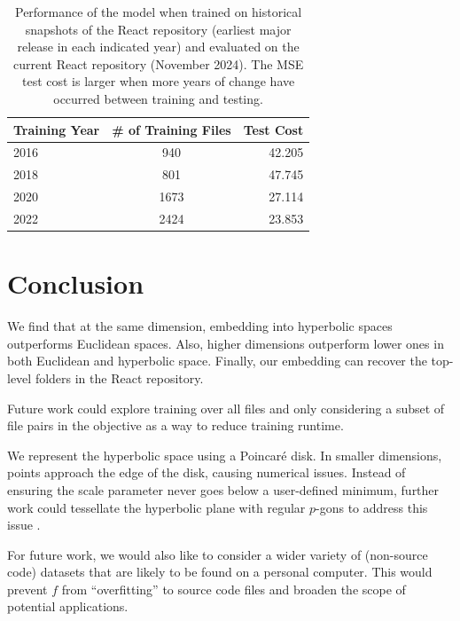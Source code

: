 \documentclass{article}
\begin{document}
\begin{table}[H]
  \centering
  \begin{tabular}{lcr}
    \toprule
    \textbf{Training Year} & \textbf{\# of Training Files} & \textbf{Test Cost} \\
    \midrule
    2016                   & 940                           & 42.205             \\
    2018                   & 801                           & 47.745             \\
    2020                   & 1673                          & 27.114             \\
    2022                   & 2424                          & 23.853             \\
    \bottomrule
  \end{tabular}
  \caption{Performance of the model when trained on historical snapshots of the React repository (earliest major release in each indicated year) and evaluated on the current React repository (November 2024). The MSE test cost is larger when more years of change have occurred between training and testing.}
  \label{tab:historical-transfer}
\end{table}

\section{Conclusion}
We find that at the same dimension, embedding into hyperbolic spaces outperforms Euclidean spaces. Also, higher dimensions outperform lower ones in both Euclidean and hyperbolic space. Finally, our embedding can recover the top-level folders in the React repository.

Future work could explore training over all files and only considering a subset of file pairs in the objective as a way to reduce training runtime.

We represent the hyperbolic space using a Poincaré disk. In smaller dimensions, points approach the edge of the disk, causing numerical issues. Instead of ensuring the scale parameter never goes below a user-defined minimum, further work could tessellate the hyperbolic plane with regular $p$-gons to address this issue \cite{celinska2024numerical}.

For future work, we would also like to consider a wider variety of (non-source code) datasets that are likely to be found on a personal computer. This would prevent $f$ from “overfitting” to source code files and broaden the scope of potential applications.


\printbibliography
\end{document}

